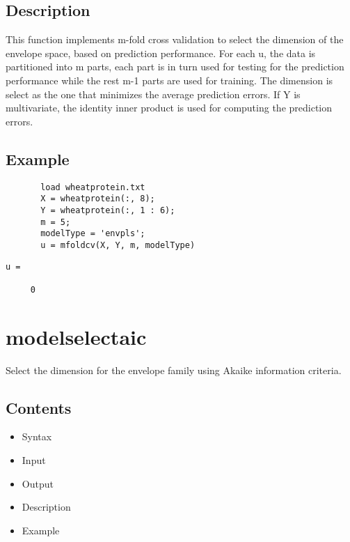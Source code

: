 \documentclass[a4paper,11pt,openany]{memoir}
\begin{document}
\subsection*{Description}

\begin{par}
This function implements m-fold cross validation to select the dimension of the envelope space, based on prediction performance.  For each u, the data is partitioned into m parts, each part is in turn used for testing for the prediction performance while the rest m-1 parts are used for training.  The dimension is select as the one that minimizes the average prediction errors. If Y is multivariate, the identity inner product is used for computing the prediction errors.
\end{par} \vspace{1em}


\subsection*{Example}


\begin{verbatim}       load wheatprotein.txt
       X = wheatprotein(:, 8);
       Y = wheatprotein(:, 1 : 6);
       m = 5;
       modelType = 'envpls';
       u = mfoldcv(X, Y, m, modelType)\end{verbatim}
    
        \color{lightgray} \ttfamily\begin{verbatim}
u =

     0

\end{verbatim}\rmfamily \color{black}

\newpage
    
\rmfamily
\color{black}\section{modelselectaic}

\begin{par}
Select the dimension for the envelope family using Akaike information criteria.
\end{par} \vspace{1em}

\subsection*{Contents}

\begin{itemize}
\setlength{\itemsep}{-1ex}
   \item Syntax
   \item Input
   \item Output
   \item Description
   \item Example
\end{itemize}
\end{document}
